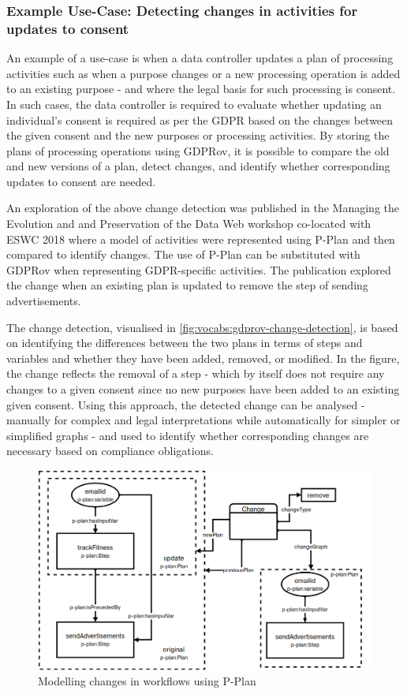 \subsubsection{Example Use-Case: Detecting changes in activities for updates to consent}
An example of a use-case is when a data controller updates a plan of processing activities such as when a purpose changes or a new processing operation is added to an existing purpose - and where the legal basis for such processing is consent.
In such cases, the data controller is required to evaluate whether updating an individual's consent is required as per the GDPR based on the changes between the given consent and the new purposes or processing activities. By storing the plans of processing operations using GDPRov, it is possible to compare the old and new versions of a plan, detect changes, and identify whether corresponding updates to consent are needed. 

An exploration of the above change detection was published in the Managing the Evolution and and Preservation of the Data Web workshop co-located with ESWC 2018 \cite{pandit_gdpr-driven_2018} where a model of activities were represented using P-Plan and then compared to identify changes. The use of P-Plan can be substituted with GDPRov when representing GDPR-specific activities.
The publication explored the change when an existing plan is updated to remove the step of sending advertisements. 

The change detection, visualised in \autoref{fig:vocabs:gdprov-change-detection}, is based on identifying the differences between the two plans in terms of steps and variables and whether they have been added, removed, or modified.
In the figure, the change reflects the removal of a step - which by itself does not require any changes to a given consent since no new purposes have been added to an existing given consent.
Using this approach, the detected change can be analysed - manually for complex and legal interpretations while automatically for simpler or simplified graphs - and used to identify whether corresponding changes are necessary based on compliance obligations.
\begin{figure}[htbp]
    \centering
    \includegraphics[width=\textwidth]{img/GDPRov-change-detection.png}
    \caption{Modelling changes in workflows using P-Plan \cite{pandit_gdpr-driven_2018}}
    \label{fig:vocabs:gdprov-change-detection}
\end{figure}

